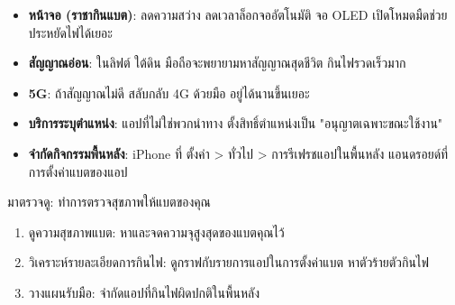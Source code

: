 \begin{itemize}
  \item \textbf{หน้าจอ (ราชากินแบต)}: ลดความสว่าง ลดเวลาล็อกจออัตโนมัติ จอ OLED เปิดโหมดมืดช่วยประหยัดไฟได้เยอะ
  \item \textbf{สัญญาณอ่อน}: ในลิฟต์ ใต้ดิน มือถือจะพยายามหาสัญญาณสุดชีวิต กินไฟรวดเร็วมาก
  \item \textbf{5G}: ถ้าสัญญาณไม่ดี สลับกลับ 4G ด้วยมือ อยู่ได้นานขึ้นเยอะ
  \item \textbf{บริการระบุตำแหน่ง}: แอปที่ไม่ใช่พวกนำทาง ตั้งสิทธิ์ตำแหน่งเป็น "อนุญาตเฉพาะขณะใช้งาน"
  \item \textbf{จำกัดกิจกรรมพื้นหลัง}: iPhone ที่ ตั้งค่า > ทั่วไป > การรีเฟรชแอปในพื้นหลัง แอนดรอยด์ที่การตั้งค่าแบตของแอป
\end{itemize}

\begin{tcbpractice}{มาตรวจดู: ทำการตรวจสุขภาพให้แบตของคุณ}
\begin{enumerate}
  \item ดูความสุขภาพแบต: หาและจดความจุสูงสุดของแบตคุณไว้
  \item วิเคราะห์รายละเอียดการกินไฟ: ดูกราฟกับรายการแอปในการตั้งค่าแบต หาตัวร้ายตัวกินไฟ
  \item วางแผนรับมือ: จำกัดแอปที่กินไฟผิดปกติในพื้นหลัง
\end{enumerate}

\end{tcbpractice}
